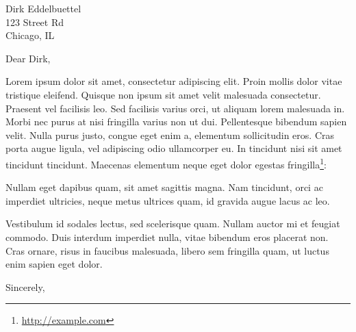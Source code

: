 \documentclass[11pt,]{letter}
\renewcommand{\href}[2]{#2\footnote{\url{#1}}}
\renewenvironment{quote}{\begin{blockquote}\list{}{\rightmargin=0em\leftmargin=0em}%
\item\relax\color{greytext}\ignorespaces}{\unskip\unskip\endlist\end{blockquote}}
\begin{document}
\begin{letter}{Dirk Eddelbuettel\\123 Street Rd\\Chicago, IL}
\opening{Dear Dirk,}

Lorem ipsum dolor sit amet, consectetur adipiscing elit. Proin mollis
dolor vitae tristique eleifend. Quisque non ipsum sit amet velit
malesuada consectetur. Praesent vel facilisis leo. Sed facilisis varius
orci, ut aliquam lorem malesuada in. Morbi nec purus at nisi fringilla
varius non ut dui. Pellentesque bibendum sapien velit. Nulla purus
justo, congue eget enim a, elementum sollicitudin eros. Cras porta augue
ligula, vel adipiscing odio ullamcorper eu. In tincidunt nisi sit amet
tincidunt tincidunt. Maecenas elementum neque eget dolor
\href{http://example.com}{egestas fringilla}:

\begin{quote}
Nullam eget dapibus quam, sit amet sagittis magna. Nam tincidunt, orci
ac imperdiet ultricies, neque metus ultrices quam, id gravida augue
lacus ac leo.
\end{quote}

Vestibulum id sodales lectus, sed scelerisque quam. Nullam auctor mi et
feugiat commodo. Duis interdum imperdiet nulla, vitae bibendum eros
placerat non. Cras ornare, risus in faucibus malesuada, libero sem
fringilla quam, ut luctus enim sapien eget dolor.

\longindentation=0pt
\closing{Sincerely,}

\end{letter}
\end{document}
